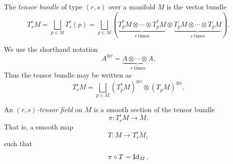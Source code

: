 \begin{definition}
  The \emph{tensor bundle} of type $(r,s)$ over a manifold $M$ is the vector bundle
  \[%
    T^r_s M = \bigsqcup_{p \in M} T^r_s(p) = \bigsqcup_{p \in M} \left(\underbrace{T_p^*M \otimes \cdots \otimes T_p^*M}_{r~\text{times}} \otimes \underbrace{T_pM \otimes \cdots \otimes T_pM}_{s~\text{times}}\right)
  .\]%
\end{definition}

\begin{note}
  We use the shorthand notation
  \[%
    A^{\otimes r} = \underbrace{A \otimes \cdots \otimes A}_{r~\text{times}}
  .\]%
  Thus the tensor bundle may be written as
  \[%
    T^r_s M = \bigsqcup_{p \in M} (T_p^*M)^{\otimes r} \otimes (T_pM)^{\otimes s}
  .\]%
\end{note}

\begin{definition}
  An \emph{$(r,s)$-tensor field} on $M$ is a smooth section of the tensor bundle
  \[%
    \pi : T^r_s M \to M
  .\]%
  That is, a smooth map
  \[%
    T : M \to T^r_s M
  ,\]%
  such that
  \[%
    \pi \circ T = \Id_M
  .\]%
\end{definition}

